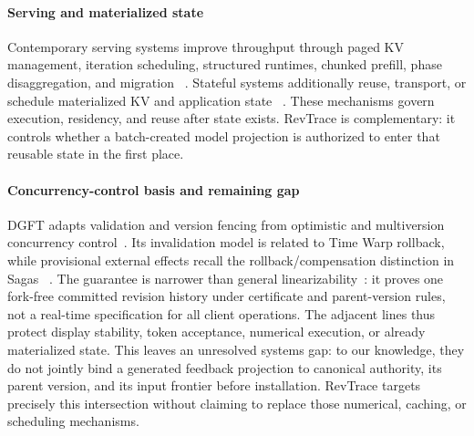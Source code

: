 \paragraph{Serving and materialized state}
Contemporary serving systems improve throughput through paged KV management,
iteration scheduling, structured runtimes, chunked prefill, phase
disaggregation, and migration
~\cite{kwon2023vllm,yu2022orca,zheng2024sglang,agrawal2024sarathi,zhong2024distserve,sun2024llumnix}.
Stateful systems additionally reuse, transport, or schedule materialized KV and
application state
~\cite{yu2025pensieve,gao2024cachedattention,lin2024parrot,luo2026agentix,qin2024mooncake}.
These mechanisms govern execution, residency, and reuse after state exists.
RevTrace is complementary: it controls whether a batch-created model projection
is authorized to enter that reusable state in the first place.

\paragraph{Concurrency-control basis and remaining gap}
DGFT adapts validation and version fencing from optimistic and multiversion
concurrency control~\cite{kung1981occ,bernstein1983mvcc}. Its invalidation model
is related to Time Warp rollback, while provisional external effects recall the
rollback/compensation distinction in Sagas
~\cite{jefferson1985virtualtime,garciamolina1987sagas}. The guarantee is narrower
than general linearizability~\cite{herlihy1990linearizability}: it proves one
fork-free committed revision history under certificate and parent-version
rules, not a real-time specification for all client operations. The adjacent
lines thus protect display stability, token acceptance, numerical execution,
or already materialized state. This leaves an unresolved systems gap: to our
knowledge, they do not jointly bind a generated feedback projection to
canonical authority, its parent version, and its input frontier before
installation. RevTrace targets precisely this
intersection without claiming to replace those numerical, caching, or
scheduling mechanisms.
